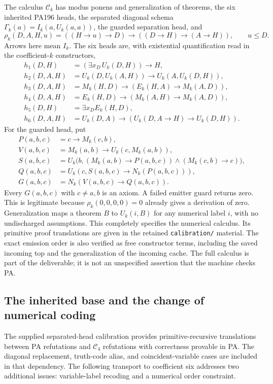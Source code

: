 \documentclass[10pt,letterpaper]{article}
\newcommand{\file}[1]{\nolinkurl{#1}}
\begin{document}
The calculus $\mathcal C_k$ has modus ponens and generalization of theorems,
the six inherited PA196 heads, the separated diagonal schema
$\Gamma_k(a)=I_k(a,U_k(a,a))$, the guarded separation head, and
\[
 \rho_k(D,A,H,u)
  =((H\to u)\to D)\to((D\to H)\to(A\to H)),\qquad u\le D.
\]
Arrows here mean $I_k$. The six heads are, with existential quantification
read in the coefficient-$k$ constructors,
\begin{align*}
 h_1(D,H)&=(\exists x_D\,U_k(D,H))\to H,\\
 h_2(D,A,H)&=U_k(D,U_k(A,H))\to U_k(A,U_k(D,H)),\\
 h_3(D,A,H)&=M_k(H,D)\to(E_k(H,A)\to M_k(A,D)),\\
 h_4(D,A,H)&=E_k(H,D)\to(M_k(A,H)\to M_k(A,D)),\\
 h_5(D,H)&=\exists x_D E_k(H,D),\\
 h_6(D,A,H)&=U_k(D,A)\to(U_k(D,A\to H)\to U_k(D,H)).
\end{align*}
For the guarded head, put
\begin{align*}
 P(a,b,c)&=c\to M_k(c,b),\\
 V(a,b,c)&=M_k(a,b)\to U_k(c,M_k(a,b)),\\
 S(a,b,c)&=U_k\bigl(b,(M_k(a,b)\to P(a,b,c))
                    \wedge(M_k(c,b)\to c)\bigr),\\
 Q(a,b,c)&=U_k(c,S(a,b,c)\to N_k(P(a,b,c))),\\
 G(a,b,c)&=N_k(V(a,b,c)\to Q(a,b,c)).
\end{align*}
Every $G(a,b,c)$ with $c\ne a,b$ is an axiom. A failed emitter guard
returns zero. This is legitimate because
$\rho_k(0,0,0,0)=0$ already gives a derivation of zero. Generalization
maps a theorem $B$ to $U_k(i,B)$ for any numerical label $i$, with no
undischarged assumptions. This completely specifies the numerical calculus.
Its primitive proof translations are given in the retained
\file{calibration/} material. The exact emission order is also verified
as free constructor terms, including the saved incoming top and the
generalization of the incoming cache. The full calculus is part of the
deliverable; it is not an unspecified assertion that the machine checks PA.

\subsection{The inherited base and the change of numerical coding}

The supplied separated-head calibration provides primitive-recursive
translations between PA refutations and $\mathcal C_4$ refutations with
correctness provable in PA\cite{primary,calibration}. The diagonal replacement,
truth-code alias, and coincident-variable cases are included in that
dependency. The following transport to coefficient six addresses two
additional issues: variable-label recoding and a numerical order constraint.
\end{document}

